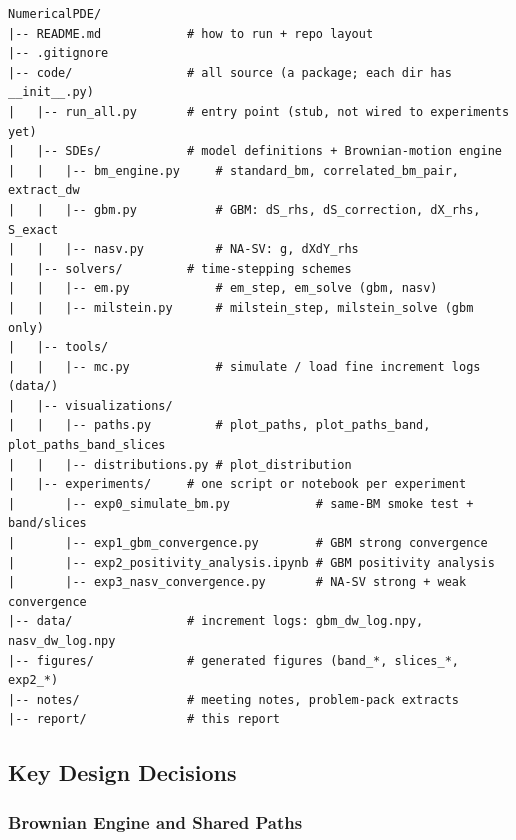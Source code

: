 \documentclass[11pt,a4paper]{article}
\theoremstyle{definition}
\theoremstyle{remark}
\begin{document}
\newpage
\begin{verbatim}
NumericalPDE/
|-- README.md            # how to run + repo layout
|-- .gitignore
|-- code/                # all source (a package; each dir has __init__.py)
|   |-- run_all.py       # entry point (stub, not wired to experiments yet)
|   |-- SDEs/            # model definitions + Brownian-motion engine
|   |   |-- bm_engine.py     # standard_bm, correlated_bm_pair, extract_dw
|   |   |-- gbm.py           # GBM: dS_rhs, dS_correction, dX_rhs, S_exact
|   |   |-- nasv.py          # NA-SV: g, dXdY_rhs
|   |-- solvers/         # time-stepping schemes
|   |   |-- em.py            # em_step, em_solve (gbm, nasv)
|   |   |-- milstein.py      # milstein_step, milstein_solve (gbm only)
|   |-- tools/
|   |   |-- mc.py            # simulate / load fine increment logs (data/)
|   |-- visualizations/
|   |   |-- paths.py         # plot_paths, plot_paths_band, plot_paths_band_slices
|   |   |-- distributions.py # plot_distribution
|   |-- experiments/     # one script or notebook per experiment
|       |-- exp0_simulate_bm.py            # same-BM smoke test + band/slices
|       |-- exp1_gbm_convergence.py        # GBM strong convergence
|       |-- exp2_positivity_analysis.ipynb # GBM positivity analysis
|       |-- exp3_nasv_convergence.py       # NA-SV strong + weak convergence
|-- data/                # increment logs: gbm_dw_log.npy, nasv_dw_log.npy
|-- figures/             # generated figures (band_*, slices_*, exp2_*)
|-- notes/               # meeting notes, problem-pack extracts
|-- report/              # this report
\end{verbatim}

\subsection{Key Design Decisions}
\label{sec:key-decisions}

\subsubsection{Brownian Engine and Shared Paths}
\label{sec:engine}
\end{document}
